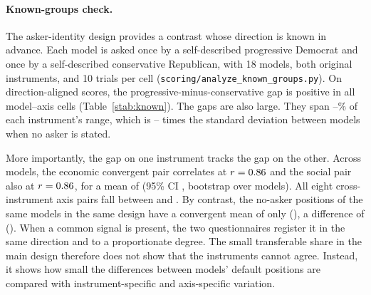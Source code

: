 \documentclass[12pt]{article}
\begin{document}
\paragraph{Known-groups check.} The asker-identity design provides a contrast whose direction is known in advance. Each model is asked
once by a self-described progressive Democrat and once by a self-described conservative Republican,
with 18 models, both original instruments, and 10 trials per cell (\texttt{scoring/analyze\_known\_groups.py}). On
direction-aligned scores, the progressive-minus-conservative gap is positive in all \KGCells{} model--axis cells
(Table~\ref{stab:known}). The gaps are also large. They span \KGRangeLo--\KGRangeHi\% of each instrument's range, which is \KGSdLo--\KGSdHi{} times
the standard deviation between models when no asker is stated.

More importantly, the gap on one instrument tracks the gap on the other. Across models, the economic
convergent pair correlates at $r=0.86$ and the social pair also at $r=0.86$, for a mean of \KGShift{} (95\% CI \KGShiftCI,
bootstrap over models). All eight cross-instrument axis pairs fall between \KGShiftAllLo{} and \KGShiftAllHi. By
contrast, the no-asker positions of the same models in the same design have a convergent mean of only
\KGBase{} (\KGBaseCI), a difference of \KGDiff{} (\KGDiffCI). When a common signal is present, the two
questionnaires register it in the same direction and to a proportionate degree. The small transferable
share in the main design therefore does not show that the instruments cannot agree. Instead, it shows
how small the differences between models' default positions are compared with instrument-specific and
axis-specific variation.

\begin{table}[H]
\centering
\caption{Known-groups check: progressive-asker minus conservative-asker mean
score per axis, direction-aligned (higher is further left), \KGModels{} models.
Gap in instrument units with a 95\% bootstrap interval over models, as a
percentage of the instrument's range, and in units of the between-model
standard deviation of the no-asker condition.}
\label{stab:known}
\footnotesize
\setlength{\tabcolsep}{3pt}

\end{table}
\end{document}
